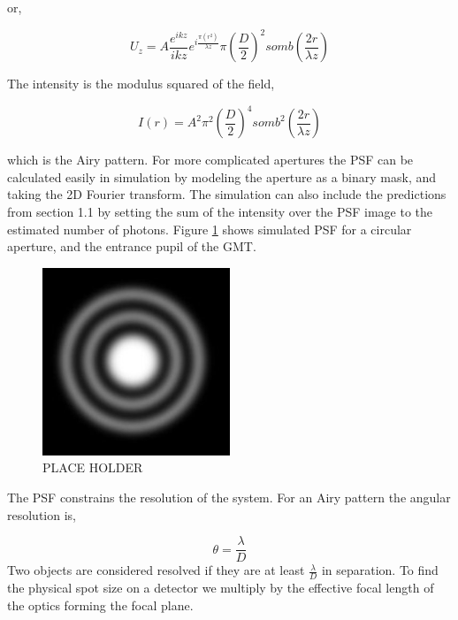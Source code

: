 or,

\begin{equation}
    U_z=A\frac{e^{ikz}}{ikz}e^{i\frac{\pi (r^2)}{\lambda z}} {\pi(\frac{D}{2})}^2 somb(\frac{2r}{\lambda z})
\end{equation} 

The intensity is the modulus squared of the field,

\begin{equation}
    I(r)=A^2{\pi^2(\frac{D}{2})}^4 somb^2(\frac{2r}{\lambda z})
\end{equation}

which is the Airy pattern. For more complicated apertures the PSF can be calculated easily in simulation by modeling the aperture as a binary mask, and taking the 2D Fourier transform. The simulation can also include the predictions from section 1.1 by setting the sum of the intensity over the PSF image to the estimated number of photons. Figure \ref{fig:Airy} shows simulated PSF for a circular aperture, and the entrance pupil of the GMT.

\begin{figure}
    \centering
    \includegraphics[width=0.5\textwidth]{Chapter Materials/Introduction Materials/Introduction Figures/Airy_disk_Placeholder.jpg}
    \caption{PLACE HOLDER}
    \label{fig:Airy}
\end{figure}


The PSF constrains the resolution of the system. For an Airy pattern the angular resolution is,

\begin{equation}
    \theta=\frac{ \lambda}{D}
\end{equation}
Two objects are considered resolved if they are at least $\frac{ \lambda}{D}$ in separation. To find the physical spot size on a detector we multiply by the effective focal length of the optics forming the focal plane.

